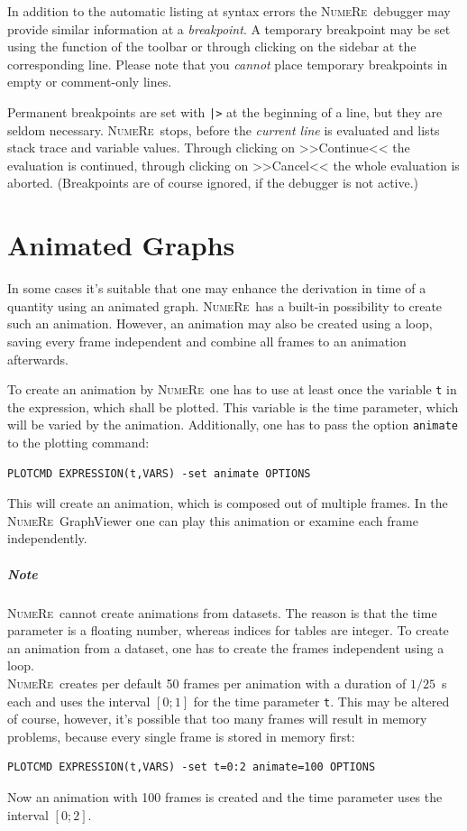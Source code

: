 \documentclass[DIV=14,headsepline,footsepline]{scrbook}
\newcommand{\NR}{\textsc{Nu\-me\-Re}}
\begin{document}
				In addition to the automatic listing at syntax errors the \NR\ debugger may provide similar information at a \emph{breakpoint}. A temporary breakpoint may be set using the function of the toolbar or through clicking on the sidebar at the corresponding line. Please note that you \emph{cannot} place temporary breakpoints in empty or comment-only lines.
				
				Permanent breakpoints are set with \verb+|>+ at the beginning of a line, but they are seldom necessary. \NR\ stops, before the \emph{current line} is evaluated and lists stack trace and variable values. Through clicking on >>Continue<< the evaluation is continued, through clicking on >>Cancel<< the whole evaluation is aborted. (Breakpoints are of course ignored, if the debugger is not active.)
				
		\chapter{Animated Graphs}
			In some cases it's suitable that one may enhance the derivation in time of a quantity using an animated graph. \NR\ has a built-in possibility to create such an animation. However, an animation may also be created using a loop, saving every frame independent and combine all frames to an animation afterwards.
			
			To create an animation by \NR\ one has to use at least once the variable \verb+t+ in the expression, which shall be plotted. This variable is the time parameter, which will be varied by the animation. Additionally, one has to pass the option \verb+animate+ to the plotting command:
			\begin{lstlisting}
PLOTCMD EXPRESSION(t,VARS) -set animate OPTIONS
			\end{lstlisting}
			This will create an animation, which is composed out of multiple frames. In the \NR\ Graph\-Viewer one can play this animation or examine each frame independently.
			
			\paragraph{Note}
				\NR\ cannot create animations from datasets. The reason is that the time parameter is a floating number, whereas indices for tables are integer. To create an animation from a dataset, one has to create the frames independent using a loop.\bigskip\\
			\NR\ creates per default 50 frames per animation with a duration of $1/25$~s each and uses the interval $[0;1]$ for the time parameter \verb+t+. This may be altered of course, however, it's possible that too many frames will result in memory problems, because every single frame is stored in memory first:
			\begin{lstlisting}
PLOTCMD EXPRESSION(t,VARS) -set t=0:2 animate=100 OPTIONS
			\end{lstlisting}
			Now an animation with 100 frames is created and the time parameter uses the interval $[0;2]$.
\end{document}
